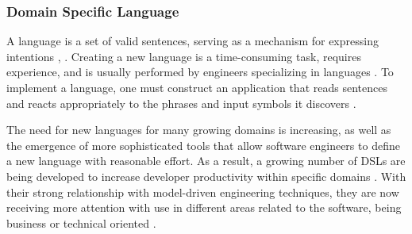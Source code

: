 \subsubsection{Domain Specific Language}


A language is a set of valid sentences, serving as a mechanism for expressing intentions \cite{parr2010}, \cite{bentley1987}. Creating a new language is a time-consuming task, requires experience, and is usually performed by engineers specializing in languages \cite{karsai2014}. To implement a language, one must construct an application that reads sentences and reacts appropriately to the phrases and input symbols it discovers \cite{parr2013}.


The need for new languages for many growing domains is increasing, as well as the emergence of more sophisticated tools that allow software engineers to define a new language with reasonable effort. As a result, a growing number of DSLs are being developed to increase developer productivity within specific domains \cite{karsai2014}. With their strong relationship with model-driven engineering techniques, they are now receiving more attention with use in different areas related to the software, being business or technical oriented \cite{collet2014}.

